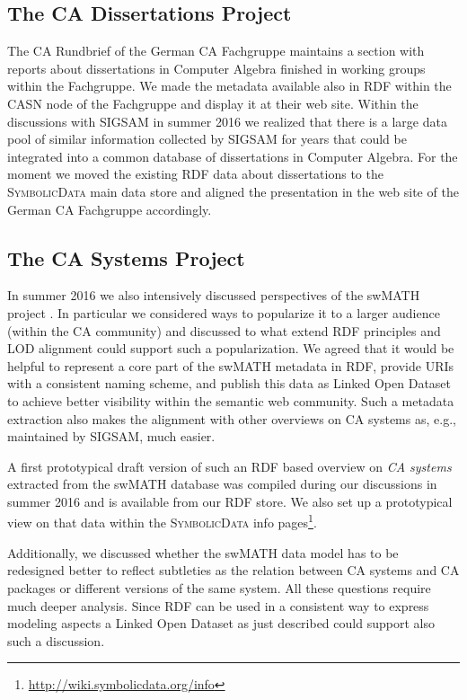 \documentclass{mathincs}
\newcommand{\SD}{\textsc{Symbo\-lic\-Data}}
\begin{document}
\subsection{The CA Dissertations Project}

The CA Rundbrief of the German CA Fachgruppe maintains a section with reports
about dissertations in Computer Algebra finished in working groups within the
Fachgruppe.  We made the metadata available also in RDF within the CASN node
of the Fachgruppe and display it at their web site.  Within the discussions
with SIGSAM in summer 2016 we realized that there is a large data pool of
similar information collected by SIGSAM for years that could be integrated
into a common database of dissertations in Computer Algebra. For the moment we
moved the existing RDF data about dissertations to the {\SD} main data store
and aligned the presentation in the web site of the German CA Fachgruppe
accordingly.

\subsection{The CA Systems Project}

In summer 2016 we also intensively discussed perspectives of the swMATH
project \cite{swmath}. In particular we considered ways to popularize it to a
larger audience (within the CA community) and discussed to what extend RDF
principles and LOD alignment could support such a popularization.  We agreed
that it would be helpful to represent a core part of the swMATH metadata in
RDF, provide URIs with a consistent naming scheme, and publish this data as
Linked Open Dataset to achieve better visibility within the semantic web
community.  Such a metadata extraction also makes the alignment with other
overviews on CA systems as, e.g., maintained by SIGSAM, much easier.

A first prototypical draft version of such an RDF based overview on \emph{CA
  systems} extracted from the swMATH database was compiled during our
discussions in summer 2016 and is available from our RDF store.  We also set up
a prototypical view on that data within the {\SD} info pages\footnote{
  \url{http://wiki.symbolicdata.org/info}}.

Additionally, we discussed whether the swMATH data model has to be redesigned
better to reflect subtleties as the relation between CA systems and CA
packages or different versions of the same system.  All these questions
require much deeper analysis.  Since RDF can be used in a consistent way to
express modeling aspects a Linked Open Dataset as just described could support
also such a discussion.
\end{document}
